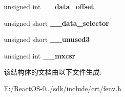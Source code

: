 \begin{DoxyCompactItemize}
unsigned int {\bfseries \+\_\+\+\_\+data\+\_\+offset}
\item 
\mbox{\label{structfenv__t_ad6a569f87cc786a722cd6081c36a545f}} 
unsigned short {\bfseries \+\_\+\+\_\+data\+\_\+selector}
\item 
\mbox{\label{structfenv__t_a8c7134051e5820dbb29b6b143496e809}} 
unsigned short {\bfseries \+\_\+\+\_\+unused3}
\item 
\mbox{\label{structfenv__t_a221f167c25ad0bc8f3f439cef117f24b}} 
unsigned int {\bfseries \+\_\+\+\_\+mxcsr}
\end{DoxyCompactItemize}


该结构体的文档由以下文件生成\+:\begin{DoxyCompactItemize}
\item 
E\+:/\+React\+O\+S-\/0../sdk/include/crt/fenv.\+h\end{DoxyCompactItemize}
